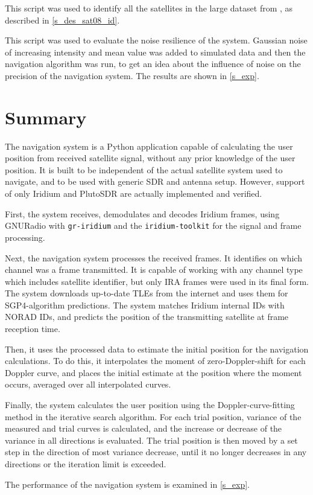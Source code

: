  This script was used to identify all the satellites in the large dataset from \cite{sat08}, as described in \autoref{s_des_sat08_id}.

 This script was used to evaluate the noise resilience of the system. Gaussian noise of increasing intensity and mean value was added to simulated data and then the navigation algorithm was run, to get an idea about the influence of noise on the precision of the navigation system. The results are shown in \autoref{s_exp}.

\section{Summary}
The navigation system is a Python application capable of calculating the user position from received satellite signal, without any prior knowledge of the user position. It is built to be independent of the actual satellite system used to navigate, and to be used with generic SDR and antenna setup. However, support of only Iridium and PlutoSDR are actually implemented and verified.

First, the system receives, demodulates and decodes Iridium frames, using GNURadio with \texttt{gr-iridium} and the \texttt{iridium-toolkit} for the signal and frame processing.

Next, the navigation system processes the received frames. It identifies on which channel was a frame transmitted. It is capable of working with any channel type which includes satellite identifier, but only IRA frames were used in its final form. The system downloads up-to-date TLEs from the internet and uses them for SGP4-algorithm predictions. The system matches Iridium internal IDs with NORAD IDs, and predicts the position of the transmitting satellite at frame reception time.

Then, it uses the processed data to estimate the initial position for the navigation calculations. To do this, it interpolates the moment of zero-Doppler-shift for each Doppler curve, and places the initial estimate at the position where the moment occurs, averaged over all interpolated curves.

Finally, the system calculates the user position using the Doppler-curve-fitting method in the iterative search algorithm. For each trial position, variance of the measured and trial curves is calculated, and the increase or decrease of the variance in all directions is evaluated. The trial position is then moved by a set step in the direction of most variance decrease, until it no longer decreases in any directions or the iteration limit is exceeded.

The performance of the navigation system is examined in \autoref{s_exp}.
